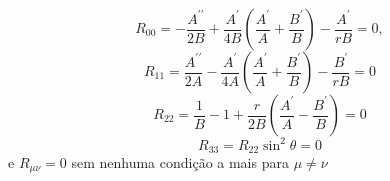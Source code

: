 \begin{equation}\label{eq:SolucaoR00}
	R_{00}=-\frac{A^{\prime \prime}}{2 B}+\frac{A^{\prime}}{4 B}\left(\frac{A^{\prime}}{A}+\frac{B^{\prime}}{B}\right)-\frac{A^{\prime}}{r B}=0,
\end{equation}
\begin{equation}\label{eq:SolucaoR11}
	R_{11}=\frac{A^{\prime \prime}}{2 A}-\frac{A^{\prime}}{4 A}\left(\frac{A^{\prime}}{A}+\frac{B^{\prime}}{B}\right)-\frac{B^{\prime}}{r B}=0
\end{equation}
\begin{equation}\label{eq:SolucaoR22}
	R_{22}=\frac{1}{B}-1+\frac{r}{2 B}\left(\frac{A^{\prime}}{A}-\frac{B^{\prime}}{B}\right)=0
\end{equation}
\begin{equation}\label{eq:SolucaoR33}
	R_{33}=R_{22} \sin ^{2} \theta=0
\end{equation}
e $R_{\mu\nu}=0$ sem nenhuma condição a mais para $\mu\neq\nu$